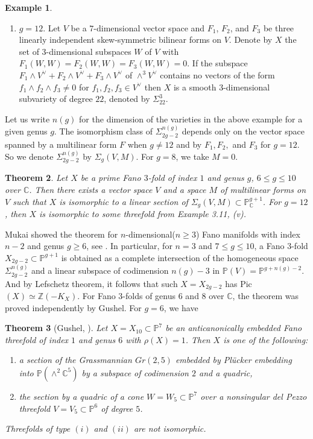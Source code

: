 \documentclass[11pt]{amsart}
\theoremstyle{plain}
\newtheorem{theorem}{Theorem}[section]
\theoremstyle{definition}
\newtheorem{example}[theorem]{Example}
\theoremstyle{expl}
\begin{document}
\begin{example}
\begin{enumerate}
            \item[(v)] $g=12$. Let $V$ be a $7$-dimensional vector space and $F_1$, $F_2$, and $F_3$ be three linearly independent skew-symmetric bilinear forms on $V$. Denote by $X$ the set of $3$-dimensional subspaces $W$ of $V$ with $F_1(W,W)=F_2(W,W)=F_3(W,W)=0$. If the subspace $F_1 \wedge V^{\vee} + F_2 \wedge V^{\vee} + F_3 \wedge V^{\vee}$ of $\wedge^3 V^{\vee}$ contains no vectors of the form $f_1 \wedge f_2 \wedge f_3 \neq 0$ for $f_1, f_2, f_3 \in V^{\vee}$ then $X$ is a smooth $3$-dimensional subvariety of degree $22$, denoted by $\Sigma_{22}^3$.
        \end{enumerate}
\end{example}

Let us write $n(g)$ for the dimension of the varieties in the above example for a given genus $g$. The isomorphism class of $\Sigma_{2g-2}^{n(g)}$ depends only on the vector space spanned by a multilinear form $F$ when $g\neq 12$ and by $F_1, F_2,$ and $F_3$ for $g=12$. So we denote $\Sigma_{2g-2}^{n(g)}$ by $\Sigma_g(V,M)$. For $g=8$, we take $M=0$.  
\begin{theorem}
    Let $X$ be a prime Fano $3$-fold of index $1$ and genus $g$, $6\leq g \leq 10$ over $\mathbb{C}$. Then there exists a vector space $V$ and a space $M$ of multilinear forms on $V$ such that $X$ is isomorphic to a linear section of $\Sigma_g(V,M) \subset \mathbb{P}^{g+1}_{\mathbb{C}}$.
    For $g=12$, then $X$ is isomorphic to some threefold from Example 3.11, (v).
\end{theorem}
Mukai showed the theorem for $n$-dimensional($n\geq 3$) Fano manifolds with index $n-2$ and genus $g\geq 6$, see \cite{Muk89}.
In particular, for $n=3$ and $7 \leq g \leq 10$, a Fano $3$-fold $X_{2g-2} \subset \mathbb{P}^{g+1}$ is obtained as a complete intersection of the homogeneous space $\Sigma_{2g-2}^{n(g)}$ and a linear subspace of codimension $n(g)-3$ in $\mathbb{P}(V) = \mathbb{P}^{g+n(g)-2}$. And by Lefschetz theorem, it follows that such $X=X_{2g-2}$ has Pic $(X) \simeq \mathbb{Z}(-K_X)$.
For Fano $3$-folds of genus $6$ and $8$ over $\mathbb{C}$, the theorem was proved independently by Gushel. For $g=6$, we have  
\begin{theorem}[Gushel, \cite{Gus6}]
    Let $X=X_{10} \subset \mathbb{P}^7$ be an anticanonically embedded Fano threefold of index $1$ and genus $6$ with $\rho(X)=1$. Then $X$ is one of the following:
    \begin{enumerate}
        \item[(i)] a section of the Grassmannian $Gr(2,5)$ embedded by Pl\"{u}cker embedding into $\mathbb{P}(\wedge^2 \mathbb{C}^5)$ by a subspace of codimension $2$ and a quadric,
        \item[(ii)] the section by a quadric of a cone $W=W_5 \subset\mathbb{P}^7$ over a nonsingular del Pezzo threefold $V= V_5 \subset \mathbb{P}^6$ of degree $5$.
    \end{enumerate}
    Threefolds of type $(i)$ and $(ii)$ are not isomorphic.
\end{theorem}
\end{document}
